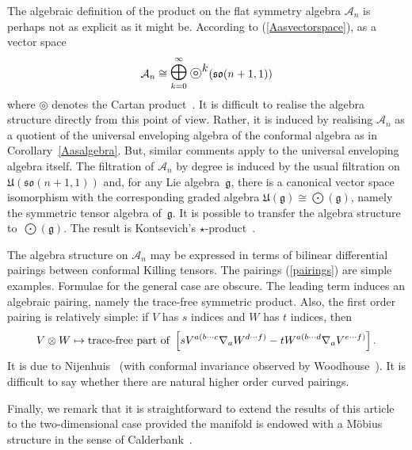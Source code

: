 \documentclass[a4paper,12pt]{amsart}
\newcommand{\topten}{\circledcirc}
\begin{document}
The algebraic definition of the product on the flat symmetry algebra
${\mathcal A}_n$ is perhaps not as explicit as it might be. According to
(\ref{Aasvectorspace}), as a vector space
$${\mathcal A}_n\cong\raisebox{2pt}{$\displaystyle\bigoplus_{k=0}^\infty$}
\:\mbox{\Large$\topten^k$}({\mathfrak{so}}(n+1,1))$$
where \mbox{\large$\topten$} denotes the Cartan product~\cite{d}. It is
difficult to realise the algebra structure directly from this point of view.
Rather, it is induced by realising ${\mathcal A}_n$ as a quotient of the
universal enveloping algebra of the conformal algebra as in
Corollary~\ref{Aasalgebra}. But, similar comments apply to the universal
enveloping algebra itself. The filtration of ${\mathcal A}_n$ by degree is
induced by the usual filtration on ${\mathfrak U}({\mathfrak{so}}(n+1,1))$ and,
for any Lie algebra~${\mathfrak g}$, there is a canonical vector space
isomorphism with the corresponding graded algebra
${\mathfrak U}({\mathfrak g})\cong\bigodot({\mathfrak g})$, namely the
symmetric tensor algebra of~${\mathfrak g}$. It is possible to transfer the
algebra structure to~$\bigodot({\mathfrak g})$. The result is Kontsevich's
$\star$-product~\cite{ads,kon}.

The algebra structure on ${\mathcal A}_n$ may be expressed in terms of bilinear
differential pairings between conformal Killing tensors. The pairings
(\ref{pairings}) are simple examples. Formulae for the general case are
obscure. The leading term induces an algebraic pairing,
namely the trace-free symmetric product. Also, the first order pairing is
relatively simple: if $V$ has $s$ indices and $W$ has $t$ indices, then
$$V\otimes W\mapsto\mbox{\rm trace-free part of }
\left[sV^{a(b\cdots c}\nabla_aW^{d\cdots f)}
-tW^{a(b\cdots d}\nabla_aV^{e\cdots f)}\right].$$
It is due to Nijenhuis~\cite{n} (with conformal invariance observed by
Woodhouse~\cite{wo}). It is difficult to say whether there are natural higher
order curved pairings.

Finally, we remark that it is straightforward to extend the results of this
article to the two-dimensional case provided the manifold is endowed with a
M\"obius structure in the sense of Calderbank~\cite{cal}.
\end{document}
